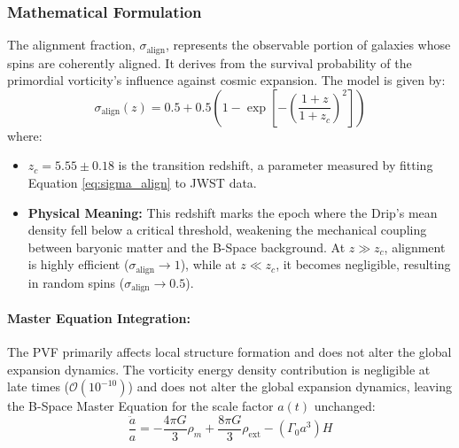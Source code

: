 \documentclass{BSpacePaper} %
\begin{document}
\begin{appendices}
\subsubsection{Mathematical Formulation}
The alignment fraction, $\sigma_{\text{align}}$, represents the observable portion of galaxies whose spins are coherently aligned. It derives from the survival probability of the primordial vorticity's influence against cosmic expansion. The model is given by:
\begin{equation}
    \sigma_{\text{align}}(z) = 0.5 + 0.5 \left(1 - \exp\left[-\left(\frac{1+z}{1+z_c}\right)^2\right]\right)
    \label{eq:sigma_align}
\end{equation}
where:
\begin{itemize}
    \item $z_c = 5.55 \pm 0.18$ is the transition redshift, a parameter measured by fitting Equation \ref{eq:sigma_align} to JWST data.
    \item \textbf{Physical Meaning:} This redshift marks the epoch where the Drip's mean density fell below a critical threshold, weakening the mechanical coupling between baryonic matter and the B-Space background. At $z \gg z_c$, alignment is highly efficient ($\sigma_{\text{align}} \to 1$), while at $z \ll z_c$, it becomes negligible, resulting in random spins ($\sigma_{\text{align}} \to 0.5$).
\end{itemize}

\paragraph{Master Equation Integration:} The PVF primarily affects local structure formation and does not alter the global expansion dynamics. The vorticity energy density contribution is negligible at late times ($\mathcal{O}(10^{-10})$) and does not alter the global expansion dynamics, leaving the B-Space Master Equation for the scale factor $a(t)$ unchanged:
\begin{equation}
    \frac{\ddot{a}}{a} = -\frac{4\pi G}{3}\rho_m + \frac{8\pi G}{3}\rho_{\text{ext}} - (\Gamma_0 a^3)H
\end{equation}


\end{appendices}
\end{document}
